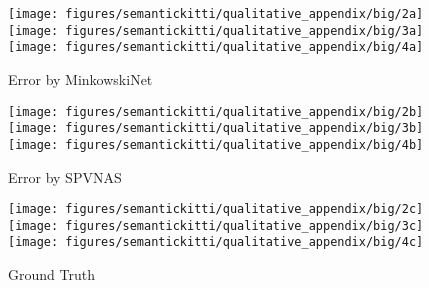 \documentclass[runningheads]{llncs}
\def\modelshort{SPVNAS\xspace}
\begin{document}
\begin{figure*}[ht!]
\centering
    \begin{subfigure}[t]{0.32\linewidth}
        \centering
        \texttt{[image: figures/semantickitti/qualitative\_appendix/big/2a]}
        \texttt{[image: figures/semantickitti/qualitative\_appendix/big/3a]}
        \texttt{[image: figures/semantickitti/qualitative\_appendix/big/4a]}
        \caption{Error by MinkowskiNet}
        \label{fig:semantickitti:appendix:mink}
    \end{subfigure}
    \begin{subfigure}[t]{0.32\linewidth}
        \centering
        \texttt{[image: figures/semantickitti/qualitative\_appendix/big/2b]}
        \texttt{[image: figures/semantickitti/qualitative\_appendix/big/3b]}
        \texttt{[image: figures/semantickitti/qualitative\_appendix/big/4b]}
        \caption{Error by \modelshort}
        \label{fig:semantickitti:appendix:spvnas}
    \end{subfigure}
    \begin{subfigure}[t]{0.32\linewidth}
        \centering
        \texttt{[image: figures/semantickitti/qualitative\_appendix/big/2c]}
        \texttt{[image: figures/semantickitti/qualitative\_appendix/big/3c]}
        \texttt{[image: figures/semantickitti/qualitative\_appendix/big/4c]}
        \caption{Ground Truth}
        \label{fig:semantickitti:appendix:gt}
    \end{subfigure}
    \caption{Qualitative comparisons between MinkowskiNet~\cite{choy20194d} and \modelshort.}
    \vspace{-8pt}
    \label{fig:semantickitti:appendix:visualizations}
\end{figure*}
\end{document}
